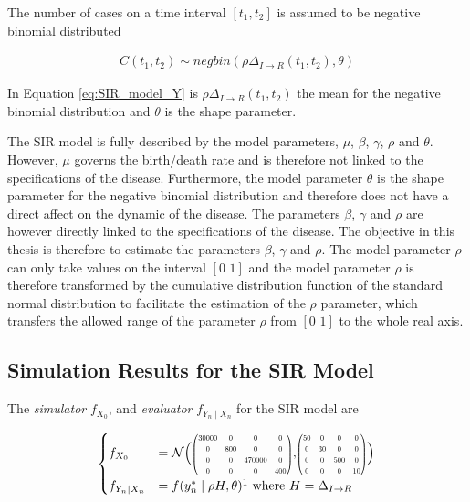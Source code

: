 \documentclass[twoside,openright]{report}
\newcommand\scalemath[2]{\scalebox{#1}{\mbox{\ensuremath{\displaystyle #2}}}}
\begin{document}
The number of cases on a time interval $[ t_1 , t_2 ]$ is assumed to be negative binomial distributed

\begin{align} \label{eq:SIR_model_Y}
    C(t_1 , t_2 ) \sim negbin( \rho \Delta_{I \rightarrow  R} (t_1 , t_2 ), \theta )
\end{align}

In Equation \ref{eq:SIR_model_Y} is $\rho \Delta_{I \rightarrow  R} (t_1 , t_2 )$  the mean for the negative binomial distribution and $\theta$ is the shape parameter.

The SIR model is fully described by the model parameters, $\mu$, $\beta$, $\gamma$, $\rho$ and $\theta$. However, $\mu$ governs the birth/death rate and is therefore not linked to the specifications of the disease. Furthermore, the model parameter $\theta$ is the shape parameter for the negative binomial distribution and therefore does not  have a direct affect on the dynamic of the disease.  The parameters  $\beta$, $\gamma$ and $\rho$ are however directly linked to the specifications of the disease. The objective in this thesis is therefore  to estimate the parameters $\beta$, $\gamma$ and $\rho$. The model parameter $\rho$ can only take values on the interval $[ 0 \,\, 1]$ and the model parameter $\rho$ is therefore transformed by the  cumulative distribution function of the standard normal distribution to facilitate the estimation of the $\rho$ parameter, which transfers the allowed range of the parameter $\rho$ from $[ 0 \,\, 1]$ to the whole real axis.   

\subsection{Simulation Results for the SIR Model}

The \textit{simulator} $f_{X_0}$,  and \textit{evaluator} $f_{Y_n \mid X_n}$ for the SIR model are 

\begin{align} \label{eq:simple_AR_model}
\begin{cases}
    f_{X_0} &= \mathcal{N} \Big( $\scalemath{0.6}{\begin{pmatrix} 
       30000 & 0 & 0 & 0 \\
       0 & 800 & 0 & 0 \\
       0 & 0 & 470000 & 0 \\
       0 & 0 & 0 & 400
     \end{pmatrix}}$,$\scalemath{0.6}{\begin{pmatrix} 
       50 & 0 & 0 & 0 \\
       0 & 30 & 0 & 0 \\
       0 & 0 & 500 & 0 \\
       0 & 0 & 0 & 10
     \end{pmatrix}}$ \Big) \\
    f_{Y_n \mid X_n} &= f( y^{*}_n \mid \rho H, \theta ) \footnotemark \,\, \text{where} \,\, H = \Delta_{I \rightarrow  R}  
\end{cases}
\end{align}
\end{document}

